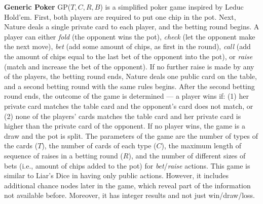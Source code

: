 \documentclass{aamas2015}
\begin{document}
\textbf{Generic Poker} GP($T,C,R,B$) is a simplified poker game inspired by Leduc Hold'em. First, both players are required to put one chip in the pot.
Next, Nature deals a single private card to each player, and the betting round begins.
A player can either \emph{fold} (the opponent wins the pot), \emph{check} (let the opponent make the next move), \emph{bet} (add some amount of chips, as first in the round), \emph{call} (add the amount of chips equal to the last bet of the opponent into the pot), or \emph{raise} (match and increase the bet of the opponent).
If no further raise is made by any of the players, the betting round ends, Nature deals one public card on the table, and a second betting round with the same rules begins.
After the second betting round ends, the outcome of the game is determined --- a player wins if: (1) her private card matches the table card and the opponent's card does not match, or (2) none of the players' cards matches the table card and her private card is higher than the private card of the opponent. If no player wins, the game is a draw and the pot is split.
The parameters of the game are the number of types of the cards ($T$), the number of cards of each type ($C$), the maximum length of sequence of raises in a betting round ($R$), and the number of different sizes of bets (i.e., amount of chips added to the pot) for \emph{bet}/\emph{raise} actions.
This game is similar to Liar's Dice in having only public actions. However, it includes additional chance nodes later in the game, which reveal part of the information not available before. Moreover, it has integer results and not just win/draw/loss.
\end{document}
